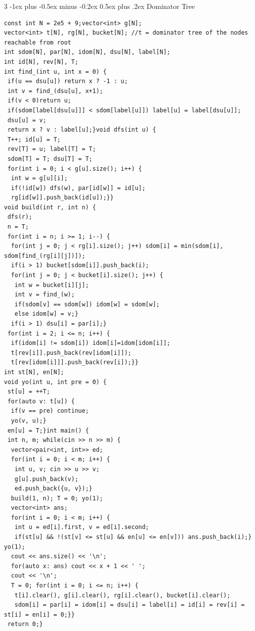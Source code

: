 \documentclass[8pt,a4paper,onesided]{article}
\makeatletter
\renewcommand{\subsection}{\@startsection{subsection}{2}{0mm}
    {-1ex plus -0.5ex minus -0.2ex} %
    {0.5ex plus .2ex}                %
    {\normalfont\large\bfseries}}    %
\makeatother
\begin{document}
\begin{multicols}{3}
\subsection{Dominator Tree}
\begin{verbatim}
const int N = 2e5 + 9;vector<int> g[N];
vector<int> t[N], rg[N], bucket[N]; //t = dominator tree of the nodes reachable from root
int sdom[N], par[N], idom[N], dsu[N], label[N];
int id[N], rev[N], T;
int find_(int u, int x = 0) {
 if(u == dsu[u]) return x ? -1 : u;
 int v = find_(dsu[u], x+1);
 if(v < 0)return u;
 if(sdom[label[dsu[u]]] < sdom[label[u]]) label[u] = label[dsu[u]];
 dsu[u] = v;
 return x ? v : label[u];}void dfs(int u) {
 T++; id[u] = T;
 rev[T] = u; label[T] = T;
 sdom[T] = T; dsu[T] = T;
 for(int i = 0; i < g[u].size(); i++) {
  int w = g[u][i];
  if(!id[w]) dfs(w), par[id[w]] = id[u];
  rg[id[w]].push_back(id[u]);}}
void build(int r, int n) {
 dfs(r);
 n = T;
 for(int i = n; i >= 1; i--) {
  for(int j = 0; j < rg[i].size(); j++) sdom[i] = min(sdom[i], sdom[find_(rg[i][j])]);
  if(i > 1) bucket[sdom[i]].push_back(i);
  for(int j = 0; j < bucket[i].size(); j++) {
   int w = bucket[i][j];
   int v = find_(w);
   if(sdom[v] == sdom[w]) idom[w] = sdom[w];
   else idom[w] = v;}
  if(i > 1) dsu[i] = par[i];}
 for(int i = 2; i <= n; i++) {
  if(idom[i] != sdom[i]) idom[i]=idom[idom[i]];
  t[rev[i]].push_back(rev[idom[i]]);
  t[rev[idom[i]]].push_back(rev[i]);}}
int st[N], en[N];
void yo(int u, int pre = 0) {
 st[u] = ++T;
 for(auto v: t[u]) {
  if(v == pre) continue;
  yo(v, u);}
 en[u] = T;}int main() {
 int n, m; while(cin >> n >> m) {
  vector<pair<int, int>> ed;
  for(int i = 0; i < m; i++) {
   int u, v; cin >> u >> v;
   g[u].push_back(v);
   ed.push_back({u, v});}
  build(1, n); T = 0; yo(1);
  vector<int> ans;
  for(int i = 0; i < m; i++) {
   int u = ed[i].first, v = ed[i].second;
   if(st[u] && !(st[v] <= st[u] && en[u] <= en[v])) ans.push_back(i);} yo(1);
  cout << ans.size() << '\n';
  for(auto x: ans) cout << x + 1 << ' ';
  cout << '\n';
  T = 0; for(int i = 0; i <= n; i++) {
   t[i].clear(), g[i].clear(), rg[i].clear(), bucket[i].clear();
   sdom[i] = par[i] = idom[i] = dsu[i] = label[i] = id[i] = rev[i] = st[i] = en[i] = 0;}}
 return 0;}
\end{verbatim}

\end{multicols}
\end{document}
